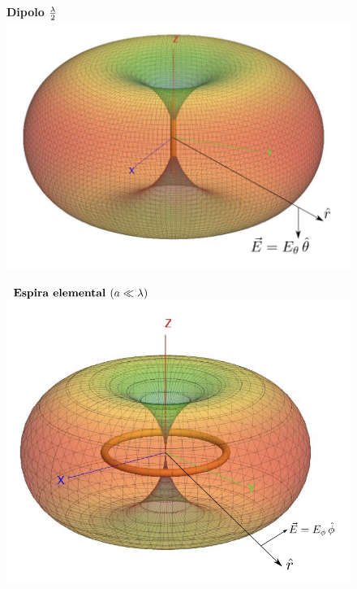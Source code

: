 \documentclass[twocolumn, 8pt]{extarticle}
\begin{document}
\begin{multicols}{2}
    \begin{figure}[H]
        \centering
        \textbf{Dipolo }\( \frac{\lambda}{2} \vspace{0.6cm} \)
        \includegraphics[width=\columnwidth]{diagrama_dipolo.png}
    \end{figure}

    \begin{figure}[H]
        \centering
        \(\textbf{ Espira elemental } \newline (a \ll \lambda) \)
        \includegraphics[width=\columnwidth]{espira_elemental.png}
    \end{figure}
\end{multicols}
\end{document}
